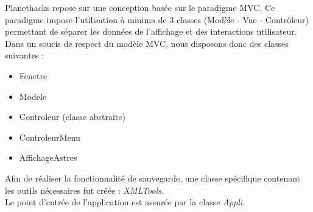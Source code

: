 \documentclass[a4paper,10pt]{article}
\begin{document}
Planethacks repose sur une conception basée sur le paradigme MVC. Ce paradigme impose l'utilisation à minima de 3 classes (Modèle - Vue - Contrôleur) permettant de
séparer les données de l'affichage et des interactions utilisateur. \\ 
Dans un soucis de respect du modèle MVC, nous disposons donc des classes suivantes :
\begin{itemize}
  \item Fenetre
  \item Modele
  \item Controleur (classe abstraite)
  \item ControleurMenu
  \item AffichageAstres
\end{itemize}

Afin de réaliser la fonctionnalité de sauvegarde, une classe spécifique contenant les outils nécessaires fut créée : \textit{XMLTools}. \\
Le point d'entrée de l'application est assurée par la classe \textit{Appli}.
\end{document}

